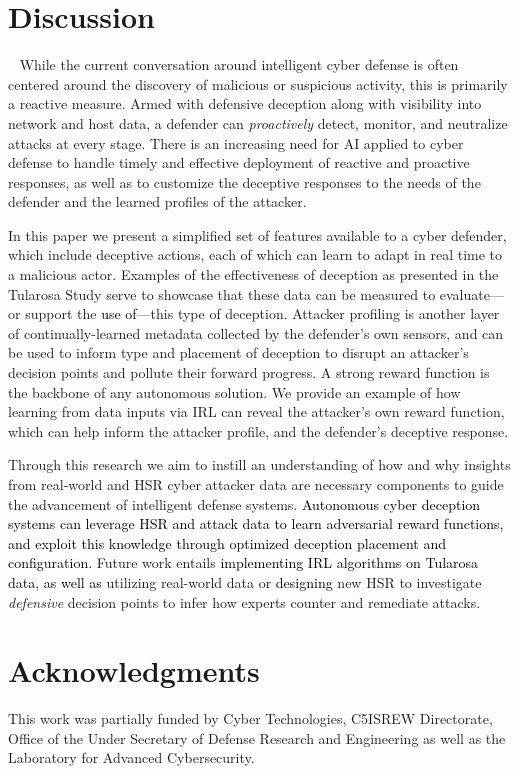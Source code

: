 \documentclass{article}
\newcommand\kjf[1]{\textcolor{black}{#1}}
\newcommand\nnn[1]{\textcolor{black}{#1}}
\begin{document}
\section{Discussion}~\label{sec:conclusion}
While the current conversation around intelligent cyber defense is often centered around the discovery of malicious or suspicious activity, this is primarily a reactive measure.  Armed with defensive deception along with visibility into network and host data, a defender can \emph{proactively} detect, monitor, and neutralize attacks at every stage. There is an increasing need for AI applied to cyber defense to handle timely and effective deployment of reactive and proactive responses, as well as to customize the deceptive responses to the needs of the defender and the learned profiles of the attacker. 

In this paper we present a simplified set of features available to a cyber defender, which include deceptive actions, each of which can learn to adapt in real time to a malicious actor. Examples of the effectiveness of deception as presented in the Tularosa Study serve to showcase that these data can be measured to evaluate---or support the \kjf{use of}---this type of deception. Attacker profiling is another layer of continually-learned metadata collected by the defender's own sensors, and can be used to inform type and placement of deception to disrupt an attacker's decision points and pollute their forward progress. A strong reward function is the backbone of any autonomous solution. We provide an example of how learning from data inputs via IRL can reveal the attacker's own reward function, which can help inform the attacker profile, and the defender's deceptive response.

 Through this research we aim to instill an understanding of how and why insights from real-world and HSR cyber attacker data are necessary components to guide the advancement of intelligent defense systems. \nnn{Autonomous cyber deception systems can leverage HSR and attack data to learn adversarial reward functions, and exploit this knowledge through optimized deception placement} \kjf{and configuration.} Future work entails \kjf{implementing IRL algorithms on Tularosa data, as well as} utilizing real-world data or \kjf{designing} new HSR to investigate \emph{defensive} decision points to infer how experts counter and remediate attacks. 

%
\section*{Acknowledgments}
%
This work was partially funded by Cyber Technologies, C5ISREW Directorate, Office of the Under Secretary of Defense Research and Engineering as well as the Laboratory for Advanced Cybersecurity.



\small

\normalsize
\end{document}
